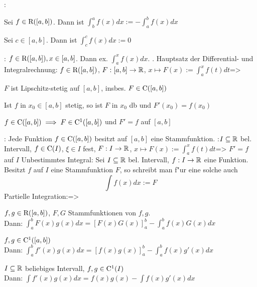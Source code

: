 :{
  Sei $f\in{\rm R}([a,b])$. Dann ist $\int_b^a f(x)dx:=-\int_a^b f(x)dx$
  
  Sei $c\in[a,b]$. Dann ist $\int_c^c f(x)dx:=0$
  }
\remark:{
  $f\in{\rm R}([a,b]),x\in[a,b]$. Dann ex. $\int_a^x f(x)dx$.
  }
. Hauptsatz der Differential- und Integralrechnung:
  $f\in{\rm R}([a,b])$,
  $F:[a,b]\to\mathbb R$, $x\mapsto F(x):=\int\nolimits_a^x f(t)dt$=>{
  \begin{stmts}
    \item $F$ ist Lipschitz-stetig auf $[a,b]$, insbes. $F\in{\rm C}([a,b])$
    \item Ist $f$ in $x_0\in[a,b]$ stetig, so ist $F$ in $x_0$ db und 
          $F'(x_0)=f(x_0)$
    \item $f\in{\rm C}([a,b])\implies F\in{\rm C}^1([a,b])$ und $F'=f$ auf 
          $[a,b]$
    \end{stmts}
  }
\remark:{
  Jede Funktion $f\in{\rm C}([a,b])$ besitzt auf $[a,b]$ eine Stammfunktion.
  }
\theorem:$I\subseteq\mathbb R$ bel. Intervall, $f\in{\rm C}(I)$, 
  $\xi\in I$ fest, 
  $F:I\to\mathbb R$, $x\mapsto F(x):=\int\nolimits_a^x f(t)dt$=>{
  $F'=f$ auf $I$
  }
 Unbestimmtes Integral:{
  Sei $I\subseteq\mathbb R$ bel. Intervall, $f:I\to\mathbb R$ eine Funktion.
  Besitzt $f$ auf $I$ eine Stammfunktion $F$, so schreibt man f"ur eine 
  solche auch 
  \[\int f(x)dx:=F
    \]
  }
\theorem Partielle Integration:=>{
  \begin{stmts}
    \item $f,g\in{\rm R}([a,b])$, $F,G$ Stammfunktionen von $f,g$.\\
      Dann: $\int_a^b F(x)g(x)dx =[F(x)G(x)]_a^b-\int_a^b f(x)G(x)dx$
    \item $f,g\in{\rm C}^1([a,b])$\\
      Dann: $\int_a^b f'(x)g(x)dx= [f(x)g(x)]_a^b-\int_a^b f(x)g'(x)dx$
    \item $I\subseteq\mathbb R$ beliebiges Intervall, $f,g\in{\rm C}^1(I)$\\
      Dann: $\int f'(x)g(x)dx = f(x)g(x)-\int f(x)g'(x) dx$
    \end{stmts}
  }
